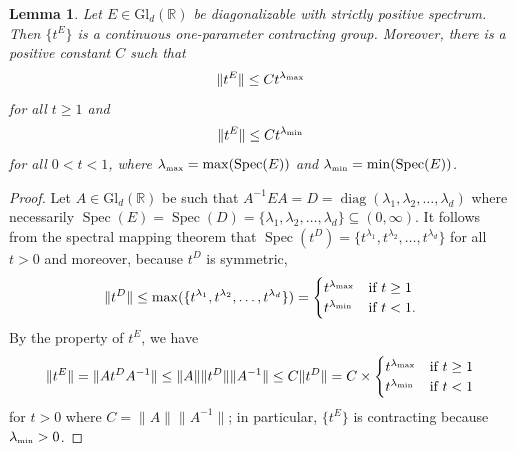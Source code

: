 \documentclass[11pt, letter]{book}
\newtheorem{lemma}[theorem]{Lemma}
\newcommand\GldR{\mbox{Gl}_d(\mathbb{R})}%
\newcommand\diag{\operatorname{diag}}
\newcommand\Spec{\operatorname{Spec}}
\begin{document}
\begin{lemma}\label{lem:SpectralEstimateforContractingGroup}
Let $E\in\GldR$ be diagonalizable with strictly positive spectrum. Then $\{t^E\}$ is a continuous one-parameter contracting group. Moreover, there is a positive constant $C$ such that
\begin{equation*}
\|t^E\|\leq Ct^{\lambda_{\mbox{\tiny{max}}}}
\end{equation*}
for all $t\geq 1$ and
\begin{equation*}
\|t^E\|\leq Ct^{\lambda_{\mbox{\tiny{min}}}}
\end{equation*}
for all $0<t<1$, where $\lambda_{\mbox{\tiny{max}}}=\max(\Spec(E))$ and $\lambda_{\mbox{\tiny{min}}}=\min(\Spec(E))$.
\end{lemma}
\begin{proof}
Let $A\in\GldR$ be such that $A^{-1}EA=D=\diag(\lambda_1,\lambda_2,\dots,\lambda_d)$ where necessarily $\Spec(E)=\Spec(D)=\{\lambda_1,\lambda_2,\dots,\lambda_d\}\subseteq (0,\infty)$. It follows from the spectral mapping theorem that $\Spec(t^D)=\{t^{\lambda_1},t^{\lambda_2},\dots,t^{\lambda_d}\}$ for all $t>0$ and moreover, because $t^D$ is symmetric,
\begin{equation*}
\|t^D\|\leq \max(\{t^{\lambda_1},t^{\lambda_2},\dots,t^{\lambda_d}\})
=\begin{cases}
t^{\lambda_{\mbox{\tiny{max}}}} & \mbox{if }t\geq 1\\
t^{\lambda_{\mbox{\tiny{min}}}} & \mbox{if }t<1.
\end{cases}
\end{equation*}
By the property of $t^E$, we have
\begin{equation*}
\|t^E\|=\|At^DA^{-1}\|\leq \|A\|\|t^D\|\|A^{-1}\|\leq C\|t^D\|=C\times
\begin{cases}
t^{\lambda_{\mbox{\tiny{max}}}} & \mbox{if }t\geq 1\\
t^{\lambda_{\mbox{\tiny{min}}}} & \mbox{if }t<1
\end{cases}
\end{equation*}
for $t>0$ where $C=\|A\|\|A^{-1}\|$; in particular, $\{t^E\}$ is contracting because $\lambda_{\mbox{\tiny{min}}}>0$.
\end{proof}
\end{document}
